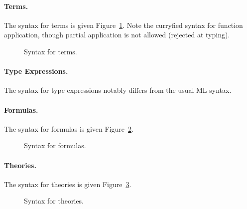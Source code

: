 \begin{center}\framebox{}\end{center}

\paragraph{Terms.}
The syntax for terms is given Figure~\ref{fig:bnf:term}.
Note the curryfied syntax for function application, though partial
application is not allowed (rejected at typing).

\begin{figure}[p]
  \begin{center}\framebox{}\end{center}
  \caption{Syntax for terms.}
\label{fig:bnf:term}
\end{figure}

\paragraph{Type Expressions.} The syntax for type
expressions notably differs from the usual ML syntax.
\begin{center}\framebox{}\end{center}

\paragraph{Formulas.}
The syntax for formulas is given Figure~\ref{fig:bnf:formula}.

\begin{figure}[p]
  \begin{center}\framebox{}\end{center}
  \caption{Syntax for formulas.}
\label{fig:bnf:formula}
\end{figure}

\paragraph{Theories.}
The syntax for theories is given Figure~\ref{fig:bnf:theory}.

\begin{figure}[p]
  \begin{center}\framebox{}\end{center}
  \caption{Syntax for theories.}
\label{fig:bnf:theory}
\end{figure}

